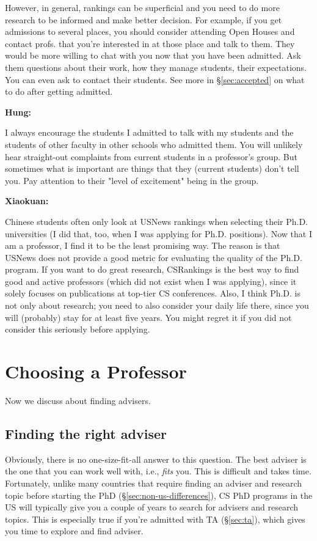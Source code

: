 \documentclass[oneside,11pt]{memoir}
\newenvironment{commentbox}[1][]{
\small
    \begin{mybox}
    {\small \textbf{#1}}
 }{
   \end{mybox}
}
\begin{document}
However, in general, rankings can be superficial and you need to do more research to be informed and make better decision. For example, if you get admissions to several places, you should consider attending Open Houses and contact profs. that you're interested in at those place and talk to them. They would be more willing to chat with you now that you have been admitted.  Ask them questions about their work, how they manage students, their expectations. You can even ask to contact their students. See more in \S\ref{sec:accepted} on what to do after getting admitted.


\begin{commentbox}[Hung:]
I always encourage the students I admitted to talk with my students and the students of other faculty in other schools who admitted them. You will unlikely hear straight-out complaints from current students in a professor’s group. But sometimes what is important are things that they (current students) don’t tell you. Pay attention to their "level of excitement" being in the group.
\end{commentbox}

\begin{commentbox}[Xiaokuan:]
Chinese students often only look at USNews rankings when selecting their Ph.D. universities (I did that, too, when I was applying for Ph.D. positions).
Now that I am a professor, I find it to be the least promising way.
%
The reason is that USNews does not provide a good metric for evaluating the quality of the Ph.D. program.
%
If you want to do great research, CSRankings is the best way to find good and active professors (which did not exist when I was applying),
since it solely focuses on publications at top-tier CS conferences.
%
Also, 
I think Ph.D. is not only about research; 
you need to also consider your daily life there, since you will (probably) stay for at least five years.
%
You might regret it if you did not consider this seriously before applying.
%
\end{commentbox}

\section{Choosing a Professor}

Now we discuss about finding advisers.

\subsection{Finding the right adviser}
Obviously, there is no one-size-fit-all answer to this question. The best adviser is the one that you can work well with, i.e., \emph{fits} you.  This is difficult and takes time.  Fortunately, unlike many countries that require finding an adviser and research topic before starting the PhD (\S\ref{sec:non-us-differences}), CS PhD programs in the US will typically give you a couple of years to search for advisers and research topics.  This is especially true if you're admitted with TA (\S\ref{sec:ta}), which gives you time to explore and find adviser. 
\end{document}
